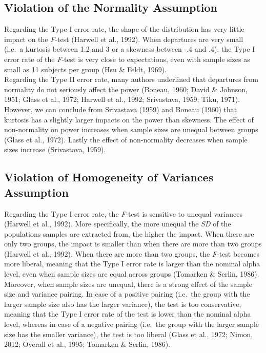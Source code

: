 \documentclass[man,floatsintext]{apa6}
\begin{document}
\hypertarget{violation-of-the-normality-assumption}{%
\subsection{Violation of the Normality Assumption}\label{violation-of-the-normality-assumption}}

Regarding the Type I error rate, the shape of the distribution has very little impact on the \emph{F}-test (Harwell et al., 1992). When departures are very small (i.e.~a kurtosis between 1.2 and 3 or a skewness between -.4 and .4), the Type I error rate of the \emph{F}-test is very close to expectations, even with sample sizes as small as 11 subjects per group (Hsu \& Feldt, 1969).\\
Regarding the Type II error rate, many authors underlined that departures from normality do not seriously affect the power (Boneau, 1960; David \& Johnson, 1951; Glass et al., 1972; Harwell et al., 1992; Srivastava, 1959; Tiku, 1971). However, we can conclude from Srivastava (1959) and Boneau (1960) that kurtosis has a slightly larger impacts on the power than skewness. The effect of non-normality on power increases when sample sizes are unequal between groups (Glass et al., 1972). Lastly the effect of non-normality decreases when sample sizes increase (Srivastava, 1959).

\hypertarget{violation-of-homogeneity-of-variances-assumption}{%
\subsection{Violation of Homogeneity of Variances Assumption}\label{violation-of-homogeneity-of-variances-assumption}}

Regarding the Type I error rate, the \emph{F}-test is sensitive to unequal variances (Harwell et al., 1992). More specifically, the more unequal the \emph{SD} of the populations samples are extracted from, the higher the impact. When there are only two groups, the impact is smaller than when there are more than two groups (Harwell et al., 1992). When there are more than two groups, the \emph{F}-test becomes more liberal, meaning that the Type I error rate is larger than the nominal alpha level, even when sample sizes are equal across groups (Tomarken \& Serlin, 1986). Moreover, when sample sizes are unequal, there is a strong effect of the sample size and variance pairing. In case of a positive pairing (i.e.~the group with the larger sample size also has the larger variance), the test is too conservative, meaning that the Type I error rate of the test is lower than the nominal alpha level, whereas in case of a negative pairing (i.e.~the group with the larger sample size has the smaller variance), the test is too liberal (Glass et al., 1972; Nimon, 2012; Overall et al., 1995; Tomarken \& Serlin, 1986).
\end{document}
